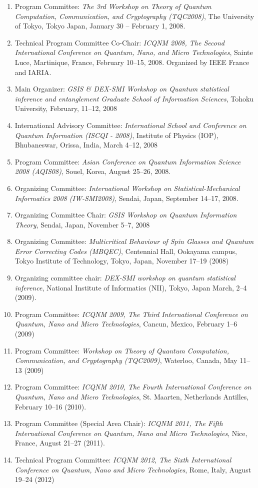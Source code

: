 \begin{enumerate}
\item Program Committee: 
{\em The 3rd Workshop on Theory of Quantum Computation, 
Communication, and Cryptography (TQC2008)}, 
The University of Tokyo, Tokyo Japan, January 30 -- February 1, 2008.
\item Technical Program Committee Co-Chair: 
{\em ICQNM 2008, The Second International Conference on Quantum, Nano, and Micro Technologies}, 
Sainte Luce, Martinique, France, February 10--15, 2008. Organized by IEEE France and IARIA.
\item Main Organizer: 
{\em GSIS \& DEX-SMI Workshop on Quantum statistical inference and entanglement Graduate School of Information Sciences}, 
Tohoku University, 
February, 11--12, 2008
\item International Advisory Committee: 
{\em International School and Conference on Quantum Information (ISCQI - 2008)},
Institute of Physics (IOP), Bhubaneswar, Orissa, India, March 4--12, 2008
\item Program Committee: 
{\em Asian Conference on Quantum Information Science 2008 (AQIS08)}, 
Souel, Korea, 
August 25--26, 2008.

\item Organizing Committee: 
{\em International Workshop on Statistical-Mechanical Informatics 2008 (IW-SMI2008)}, Sendai, Japan, September 14--17, 2008.

\item Organizing Committee Chair: 
{\em GSIS Workshop on Quantum Information Theory}, 
Sendai, Japan, November 5--7, 2008

\item Organizing Committee: 
{\em Multicritical Behaviour of Spin Glasses and Quantum Error Correcting Codes (MBQEC)}, 
Centennial Hall, Ookayama campus, Tokyo Institute of Technology, Tokyo, Japan, November 17--19 (2008)

\item Organizing committee chair: 
{\em DEX-SMI workshop on quantum statistical inference}, 
National Institute of Informatics (NII), Tokyo, Japan
March, 2--4 (2009).

\item Program Committee: 
{\em ICQNM 2009, The Third International Conference on Quantum, Nano and Micro Technologies}, 
Cancun, Mexico, February 1--6 (2009)
\item Program Committee: 
{\em Workshop on Theory of Quantum Computation, Communication, and Cryptography (TQC2009)}, Waterloo, Canada, May 11--13 (2009)
\item Program Committee: 
{\em ICQNM 2010, The Fourth International Conference on Quantum, Nano and Micro Technologies}, 
St. Maarten, Netherlands Antilles, February 10--16 (2010).
\item Program Committee (Special Area Chair): 
{\em ICQNM 2011, The Fifth International Conference on Quantum, Nano and Micro Technologies}, 
Nice, France, August 21--27 (2011).
\item Technical Program Committee: 
{\em ICQNM 2012, The Sixth International Conference on Quantum, Nano and Micro Technologies}, 
Rome, Italy, August 19--24 (2012)


\end{enumerate}
